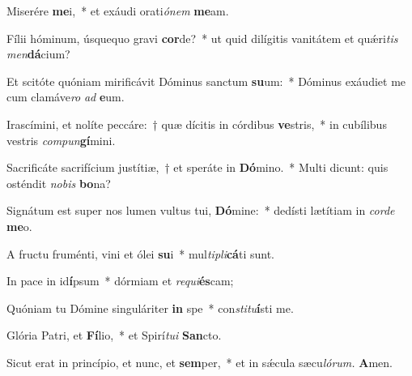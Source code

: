 \item Miserére \textbf{me}i,~* et exáudi orati\textit{ónem} \textbf{me}am.
\item Fílii hóminum, úsquequo gravi \textbf{cor}de?~* ut quid dilígitis vanitátem et quǽri\hspace{0.02em}\textit{tis} \textit{men}\textbf{dá}cium?
\item Et scitóte quóniam mirificávit Dóminus sanctum \textbf{su}um:~* Dóminus exáudiet me cum clamáve\hspace{0.01em}\textit{ro} \textit{ad} \textbf{e}um.
\item Irascímini, et nolíte peccáre:~† quæ dícitis in córdibus \textbf{ve}stris,~* in cubílibus vestris \textit{compun}\textbf{gí}mini.
\item Sacrificáte sacrifícium justítiæ,~† et speráte in \textbf{Dó}mino.~* Multi dicunt: quis osténdit \textit{nobis} \textbf{bo}na?
\item Signátum est super nos lumen vultus tui, \textbf{Dó}mine:~* dedísti lætítiam in \textit{corde} \textbf{me}o.
\item A fructu fruménti, vini et ólei \textbf{su}i~* mul\textit{tipli}\textbf{cá}ti sunt.
\item In pace in id\textbf{í}psum~* dórmiam et \textit{requi}\textbf{és}cam;
\item Quóniam tu Dómine singuláriter \textbf{in} spe~* con\tinyhspace\textit{stitu}\textbf{í}sti me.
\item Glória Patri, et \textbf{Fí}lio,~* et Spirí\tinyhspace\textit{tui} \textbf{San}cto.
\item Sicut erat in princípio, et nunc, et \textbf{sem}per,~* et in sǽcula sæcu\tinyhspace\textit{lórum.} \textbf{A}men.
